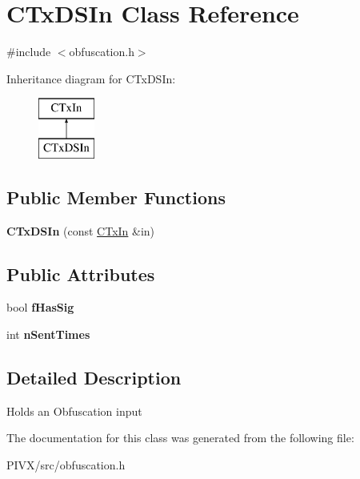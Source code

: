 \hypertarget{class_c_tx_d_s_in}{}\section{C\+Tx\+D\+S\+In Class Reference}
\label{class_c_tx_d_s_in}


{\ttfamily \#include $<$obfuscation.\+h$>$}

Inheritance diagram for C\+Tx\+D\+S\+In\+:\begin{figure}[H]
\begin{center}
\leavevmode
\includegraphics[height=2.000000cm]{class_c_tx_d_s_in}
\end{center}
\end{figure}
\subsection*{Public Member Functions}
\begin{DoxyCompactItemize}
\item 
\mbox{\label{class_c_tx_d_s_in_a20abf35067e286483bbdf59dc5e611a9}} 
{\bfseries C\+Tx\+D\+S\+In} (const \mbox{\hyperlink{class_c_tx_in}{C\+Tx\+In}} \&in)
\end{DoxyCompactItemize}
\subsection*{Public Attributes}
\begin{DoxyCompactItemize}
\item 
\mbox{\label{class_c_tx_d_s_in_a8d19a02eab96dcb39bed5a4942f996d8}} 
bool {\bfseries f\+Has\+Sig}
\item 
\mbox{\label{class_c_tx_d_s_in_ad3da7f430f5bd835b02addff54a19606}} 
int {\bfseries n\+Sent\+Times}
\end{DoxyCompactItemize}


\subsection{Detailed Description}
Holds an Obfuscation input 

The documentation for this class was generated from the following file\+:\begin{DoxyCompactItemize}
\item 
P\+I\+V\+X/src/obfuscation.\+h\end{DoxyCompactItemize}

